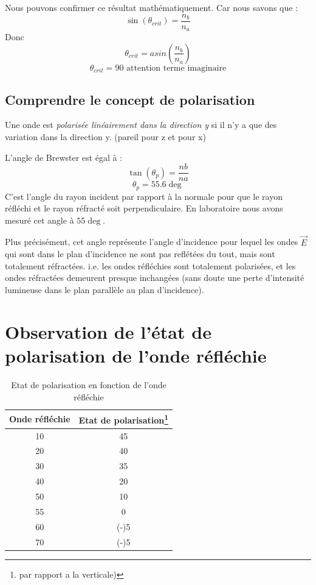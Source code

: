 \documentclass[a4paper,11pt]{article}
\begin{document}
Nous pouvons confirmer ce résultat mathématiquement. Car nous savons que :
$$ \sin (\theta_{crit} ) = \frac{n_b}{n_a} $$
Donc $$ \theta_{crit} = asin (\frac{n_b}{n_a} ) $$
$$ \theta_{crit} = 90 \text{ attention terme imaginaire}$$

\subsection{Comprendre le concept de polarisation}
Une onde est \textit{polarisée linéairement dans la direction y} si il n'y a que des variation dans la direction y. (pareil pour z et pour x)

L'angle de Brewster est égal à :
$$ \tan (\theta_p) = \frac{nb}{na} $$
$$ \theta_p = 55.6 \deg $$
C'est l'angle du rayon incident par rapport à la normale pour que le rayon réfléchi et le rayon réfracté soit perpendiculaire. En laboratoire nous avons mesuré cet angle  à $55 \deg$.

Plus précisément, cet angle représente l'angle d'incidence pour lequel les ondes $\vec{E}$ qui sont dans le plan d'incidence ne sont pas reflétées du tout, mais sont totalement réfractées. i.e. les ondes réfléchies sont totalement polarisées, et les ondes réfractées demeurent presque inchangées (sans doute une perte d'intensité lumineuse dans le plan parallèle au plan d'incidence).

\section{Observation de l'état de polarisation de l'onde réfléchie}
\begin{table}[!h]
	\begin{center}
	\begin{tabular}{|c|c|}
	\hline
		Onde réfléchie & Etat de polarisation\footnote{par rapport a la verticale)} \\
	\hline
		10 & 45 \\
		20 & 40 \\
		30 & 35 \\ 
		40 & 20 \\
		50 & 10 \\
		55 & 0 \\
		60 & (-)5 \\
		70 & (-)5 \\
	\hline
	\end{tabular}
	\caption{Etat de polarisation en fonction de l'onde réfléchie}
	\end{center}
\end{table}
\end{document}
